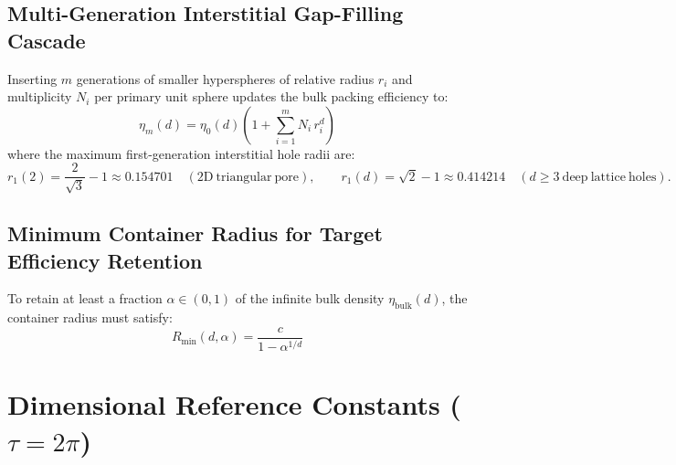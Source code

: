 \documentclass[11pt,a4paper]{article}
\begin{document}
\subsection{Multi-Generation Interstitial Gap-Filling Cascade}
Inserting $m$ generations of smaller hyperspheres of relative radius $r_i$ and multiplicity $N_i$ per primary unit sphere updates the bulk packing efficiency to:
\begin{equation}
\eta_m(d) = \eta_0(d)\left(1 + \sum_{i=1}^{m} N_i \, r_i^d\right)
\end{equation}
where the maximum first-generation interstitial hole radii are:
\begin{equation}
r_1(2) = \frac{2}{\sqrt{3}} - 1 \approx 0.154701 \quad (2\mathrm{D\ triangular\ pore}), \qquad
r_1(d) = \sqrt{2} - 1 \approx 0.414214 \quad (d \ge 3\ \mathrm{deep\ lattice\ holes}).
\end{equation}

\subsection{Minimum Container Radius for Target Efficiency Retention}
To retain at least a fraction $\alpha \in (0, 1)$ of the infinite bulk density $\eta_{\mathrm{bulk}}(d)$, the container radius must satisfy:
\begin{equation}
R_{\min}(d, \alpha) = \frac{c}{1 - \alpha^{1/d}}
\end{equation}

\section{Dimensional Reference Constants ($\tau = 2\pi$)}
\end{document}
